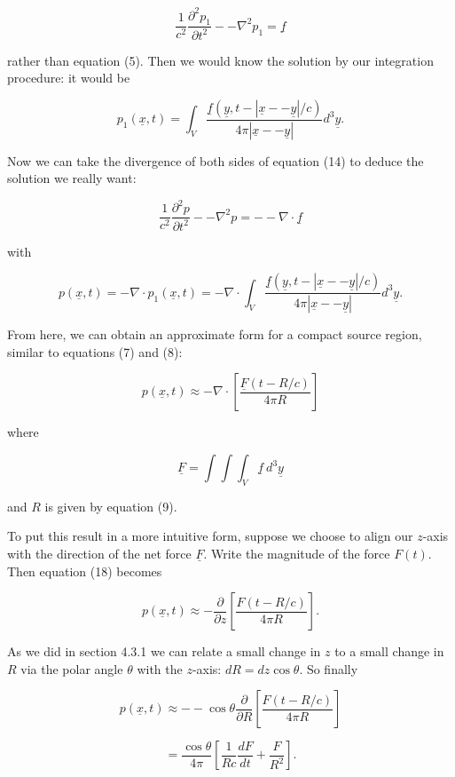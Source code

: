   $$\dfrac{1}{c^2} \dfrac{\partial^2 p_1}{\partial t^2} -- \nabla^2 p_1 = 
  \underline{f} \tag{14}$$ 

  rather than equation (5). Then we would know the solution by our integration 
  procedure: it would be 

  
  $$p_1(\underline{x},t)=\int_V{\dfrac{\underline{f}(\underline{y},t-|\underline{x} 
  -- \underline{y}|/c)}{4 \pi |\underline{x} -- \underline{y}|} d^3 
  \underline{y}} . \tag{15}$$ 

  Now we can take the divergence of both sides of equation (14) to deduce the 
  solution we really want: 

  $$\dfrac{1}{c^2} \dfrac{\partial^2 p}{\partial t^2} -- \nabla^2 p = -- \nabla 
  \cdot \underline{f} \tag{16}$$ 

  with 

  $$p(\underline{x},t) = -\nabla \cdot p_1(\underline{x},t) = -\nabla \cdot 
  \int_V{\dfrac{\underline{f}(\underline{y},t-|\underline{x} -- 
  \underline{y}|/c)}{4 \pi |\underline{x} -- \underline{y}|} d^3 \underline{y}} 
  \tag{17} .$$ 

  From here, we can obtain an approximate form for a compact source region, 
  similar to equations (7) and (8): 

  $$p(\underline{x},t) \approx -\nabla \cdot \left[ 
  \dfrac{\underline{F}(t-R/c)}{4 \pi R} \right] \tag{18}$$ 

  where 

  $$\underline{F} = \int \int \int_V{\underline{f} \mathrm{~} d^3 
  \underline{y}} \tag{19}$$ 

  and $R$ is given by equation (9). 

  To put this result in a more intuitive form, suppose we choose to align our 
  $z$-axis with the direction of the net force $\underline{F}$. Write the 
  magnitude of the force $F(t)$. Then equation (18) becomes 

  $$p(\underline{x},t) \approx -\dfrac{\partial}{\partial z} \left[ 
  \dfrac{F(t-R/c)}{4 \pi R} \right] . \tag{20}$$ 

  As we did in section 4.3.1 we can relate a small change in $z$ to a small 
  change in $R$ via the polar angle $\theta$ with the $z$-axis: $dR=dz \cos 
  \theta$. So finally 

  $$p(\underline{x},t) \approx -- \cos \theta \dfrac{\partial}{\partial R} 
  \left[ \dfrac{F(t-R/c)}{4 \pi R} \right]$$ 

  $$ = \dfrac{\cos \theta}{4 \pi}\left[ \dfrac{1}{Rc} \dfrac{dF}{dt} + 
  \dfrac{F}{R^2} \right] . \tag{21}$$ 

